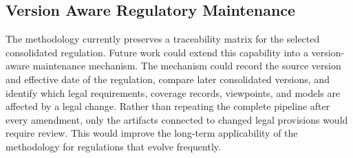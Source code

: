 \subsection{Version Aware Regulatory Maintenance}

The methodology currently preserves a traceability matrix for the selected consolidated regulation. Future work could extend this capability into a version-aware maintenance mechanism. The mechanism could record the source version and effective date of the regulation, compare later consolidated versions, and identify which legal requirements, coverage records, viewpoints, and models are affected by a legal change. Rather than repeating the complete pipeline after every amendment, only the artifacts connected to changed legal provisions would require review. This would improve the long-term applicability of the methodology for regulations that evolve frequently.